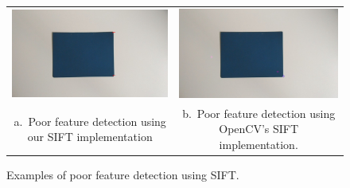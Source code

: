 \documentclass[]{IEEEtran}
\begin{document}
\begin{figure}[tb]
  \centering
  \begin{tabular}{c c}
  \includegraphics[width=0.48\linewidth]{./figures/sift/bad_sift.png} &
  \includegraphics[width=0.48\linewidth]{./figures/sift/bad_sift_OpenCV.png}\\
  a.~Poor feature detection using our SIFT implementation & b.~Poor feature detection using OpenCV's SIFT implementation.
  \end{tabular}
  \caption{Examples of poor feature detection using SIFT.}
  \label{fig:bad_sift}
\end{figure}
\end{document}
